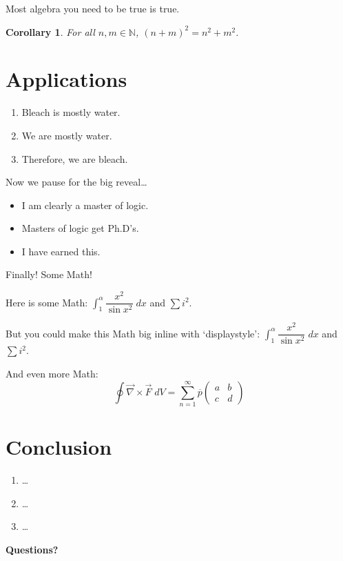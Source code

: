 \documentclass[aspectratio=169]{beamer}	%
\newcommand{\N}{\mathbb{N}}
\newcommand{\ds}{\displaystyle}
\newcommand{\ov}[1]{\overline{#1}}
\newcommand{\twomatrix}[4]{\begin{pmatrix} #1 & #2 \\ #3 & #4 \end{pmatrix}}
\theoremstyle{plain}
\newtheorem{cor}{Corollary}[section]
\theoremstyle{definition}
\theoremstyle{remark}
\numberwithin{equation}{section}
\begin{document}
\begin{frame}
Most algebra you need to be true is true.
\begin{cor}
For all $n,m \in \N$, $(n+m)^2= n^2 + m^2$.
\end{cor}
\end{frame}



\section{Applications}



\begin{frame}
	\begin{enumerate}[1.]
	\item Bleach is mostly water. \pause
	\item We are mostly water. \pause
	\item Therefore, we are bleach.
	\end{enumerate} \vspace{0.5cm}

Now we pause for the big reveal\dots \pause \vspace{0.3cm}

	\begin{itemize}
	\item I am clearly a master of logic.
	\item Masters of logic get Ph.D's.
	\item I have earned this.
	\end{itemize}
\end{frame}



\begin{frame}
Finally! Some Math! \vspace{1cm}

Here is some Math: $\int_1^\alpha \dfrac{x^2}{\sin x^2} \;dx$ and $\sum i^2$. \vspace{1cm}

But you could make this Math big inline with `displaystyle': $\ds \int_1^\alpha \dfrac{x^2}{\sin x^2} \;dx$ and $\ds \sum i^2$. \vspace{1cm}

And even more Math:
	\[
	\oint \vec{\nabla} \times \vec{F} \;dV = \sum_{n=1}^\infty \ov{p} \twomatrix{a}{b}{c}{d}
	\]
\end{frame}



\section{Conclusion}



\begin{frame}
	\begin{enumerate}[1]
	\item \dots 
	\item \dots 
	\item \dots
	\end{enumerate} \vspace{0.5cm}
\end{frame}



\begin{frame}
\begin{center} {\bfseries \Large Questions?} \end{center}
\end{frame}
\end{document}
